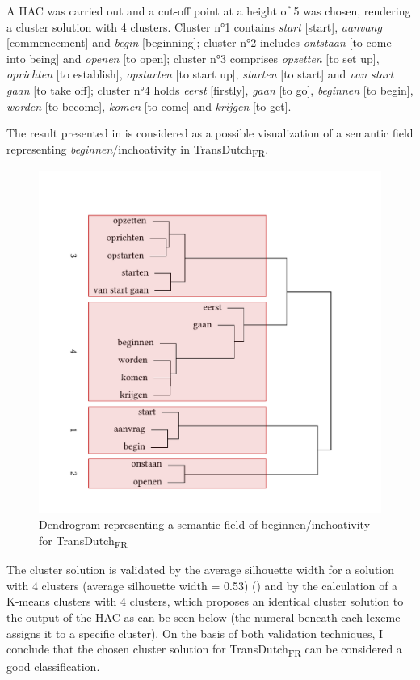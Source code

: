 A HAC was carried out and a cut-off point at a height of 5 was chosen, rendering a cluster solution with 4 clusters. Cluster n°1 contains \textit{start} [start], \textit{aanvang} [commencement] and \textit{begin} [beginning]; cluster n°2 includes \textit{ontstaan} [to come into being] and \textit{openen} [to open]; cluster n°3 comprises \textit{opzetten} [to set up], \textit{oprichten} [to establish], \textit{opstarten} [to start up], \textit{starten} [to start] and \textit{van} \textit{start} \textit{gaan} [to take off]; cluster n°4 holds \textit{eerst} [firstly], \textit{gaan} [to go], \textit{beginnen} [to begin], \textit{worden} [to become], \textit{komen} [to come] and \textit{krijgen} [to get].

The result presented in  is considered as a possible visualization of a semantic field representing \textit{beginnen}/inchoativity in TransDutch\textsubscript{FR}.

\begin{figure}
\includegraphics[height=.4\textheight]{figures/tree78.pdf}
\caption{\label{fig:4:76}  Dendrogram representing a semantic field of beginnen/inchoativity for TransDutch\textsubscript{FR}}
\end{figure}

The cluster solution is validated by the average silhouette width for a solution with 4 clusters (average silhouette width = 0.53) () and by the calculation of a K-means clusters with 4 clusters, which proposes an identical cluster solution to the output of the HAC as can be seen below (the numeral beneath each lexeme assigns it to a specific cluster). On the basis of both validation techniques, I conclude that the chosen cluster solution for TransDutch\textsubscript{FR} can be considered a good classification.

